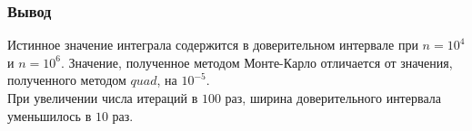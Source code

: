 \documentclass{article}
\begin{document}
        \subsubsection{Вывод}
        Истинное значение интеграла содержится в доверительном интервале при $n = 10^4$ и $n = 10^6$. Значение, полученное методом Монте-Карло отличается от значения, полученного методом $quad$, на $10^{-5}$.\\
        При увеличении числа итераций в $100$ раз, ширина доверительного интервала уменьшилось в $10$ раз.
\end{document}
